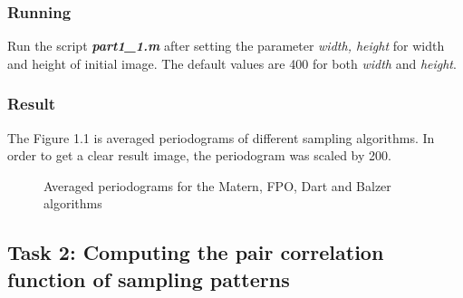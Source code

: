 \documentclass[paper=a4, fontsize=11pt]{scrartcl} %
\numberwithin{equation}{section} %
\numberwithin{figure}{section} %
\numberwithin{table}{section} %
\newcommand{\filename}[1]{\textbf{\textit{#1}}}
\begin{document}
\subsubsection{Running}

Run the script \filename{part1\_1.m} after setting the parameter \textit{width, height} for width and height of initial image. The default values are 400 for both \textit{width} and \textit{height}.

\subsubsection{Result}

The Figure 1.1 is averaged periodograms of different sampling algorithms. In order to get a clear result image, the periodogram was scaled by 200.

\begin{figure}[H]
\caption{Averaged periodograms for the Matern, FPO, Dart and Balzer algorithms\label{fig:simple}}
\noindent{}
\end{figure}

\subsection{Task 2: Computing the pair correlation function of sampling patterns}
\end{document}
